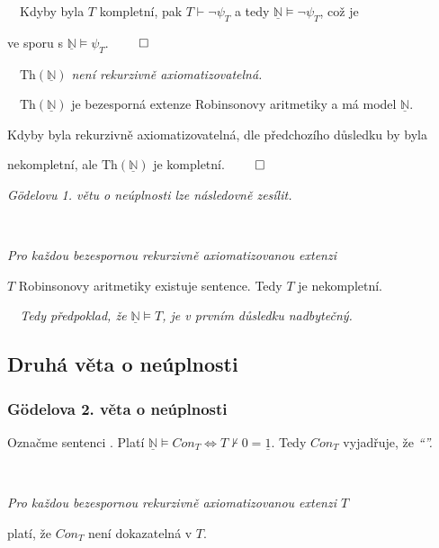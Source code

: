     \ \ Kdyby byla $T$ kompletní, pak $T\vdash \neg\psi_T$ a tedy $\underline{\mathbb{N}}\models \neg\psi_T$, což je
    \smallskip
    
    ve sporu s $\underline{\mathbb{N}}\models \psi_T$. $\qed$
    \bigskip
    
    \ \ {\it $\mathrm{Th}(\underline{\mathbb{N}})$ není rekurzivně axiomatizovatelná.}
    \medskip
    
    \ \ $\mathrm{Th}(\underline{\mathbb{N}})$ je bezesporná extenze Robinsonovy aritmetiky a má model $\underline{\mathbb{N}}$.
    \smallskip
    
    Kdyby byla rekurzivně axiomatizovatelná, dle předchozího důsledku by byla
    \smallskip
    
    nekompletní, ale $\mathrm{Th}(\underline{\mathbb{N}})$ je kompletní. $\qed$
    \bigskip
    
    {\it Gödelovu 1. větu o neúplnosti lze následovně zesílit.}
    \medskip
    
    \ \ {\it Pro každou bezespornou rekurzivně axiomatizovanou extenzi
    \smallskip
    
    $T$ Robinsonovy aritmetiky existuje  sentence. Tedy $T$ je nekompletní.}
    
    
    {\it {}\ \ Tedy předpoklad, že $\underline{\mathbb{N}}\models T$, je v prvním důsledku nadbytečný.}
    

\subsection{Druhá věta o neúplnosti}\todo

\subsubsection*{Gödelova 2. věta o neúplnosti}
    
    Označme  sentenci .
    \smallskip
    Platí $\underline{\mathbb{N}}\models Con_T \Leftrightarrow T\not\vdash 0=\underline{1}$. Tedy $Con_T$ vyjadřuje, že {\it ``''.}
    \medskip
    
    \smallskip
    
    \ \ {\it Pro každou bezespornou rekurzivně axiomatizovanou extenzi $T$
    
     platí, že $Con_T$ není dokazatelná v $T$.}
    \medskip
    
